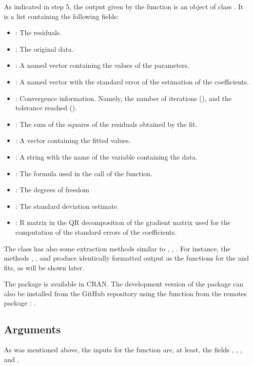 As indicated in step 5, the output given by the  function is an object of class . It is a list containing the following fields: 
\begin{itemize}
\item {}: The residuals.
\item {}: The original data. 
\item {}: A named vector containing the values of the parameters.
\item {}: A named vector with the standard error of the estimation of the coefficients.
\item {}: Convergence information. Namely, the number of iterations (), and the tolerance reached ().
\item {}: The sum of the squares of the residuals obtained by the fit. 
\item {}: A vector containing the fitted values.
\item {}: A string with the name of the variable containing the data.
\item {}: The formula used in the call of the function.
\item {}: The degrees of freedom
\item {}: The standard deviation estimate.
\item {}: R matrix in the QR decomposition of the gradient matrix used for the computation of the standard errors of the coefficients.
\end{itemize}

The class  has also some extraction methods similar to , , . For instance, the methods , , and  produce identically formatted output as the  functions for the  and  fits, as will be shown later. 

The  package \citep{package_nlstac} is available in CRAN. The development version of the package can also be installed from the GitHub repository using the  function from the remotes package \citep{package_remotes}: .


\subsection{Arguments} \label{ss_arguments}
As was mentioned above, the inputs for the  function are, at least, the fields , , ,  and .

